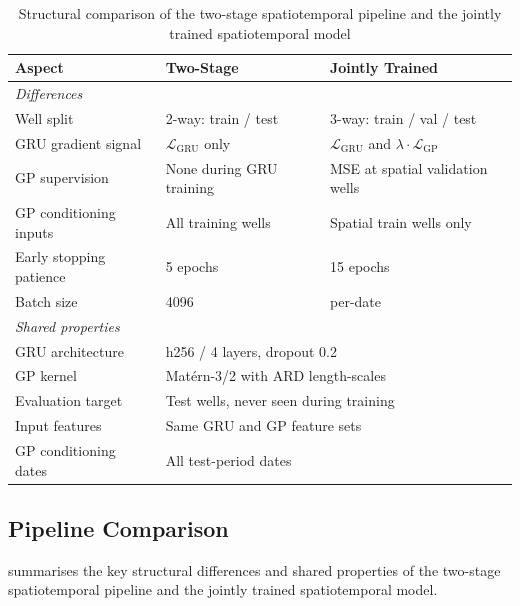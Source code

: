 \begin{table}[htbp]
\centering
\begin{tabular}{@{}lll@{}}
\toprule
\textbf{Aspect} & \textbf{Two-Stage} & \textbf{Jointly Trained} \\
\midrule
\multicolumn{3}{l}{\textit{Differences}} \\[3pt]
Well split & 2-way: train / test & 3-way: train / val / test \\
GRU gradient signal & $\mathcal{L}_{\text{GRU}}$ only & $\mathcal{L}_{\text{GRU}}$ and $\lambda \cdot \mathcal{L}_{\text{GP}}$ \\
GP supervision & None during GRU training & MSE at spatial validation wells \\
GP conditioning inputs & All training wells & Spatial train wells only \\
Early stopping patience & 5 epochs & 15 epochs \\
Batch size & 4096 & per-date \\[3pt]
\midrule
\multicolumn{3}{l}{\textit{Shared properties}} \\[3pt]
GRU architecture & \multicolumn{2}{l}{h256 / 4 layers, dropout 0.2} \\
GP kernel & \multicolumn{2}{l}{Matérn-3/2 with ARD length-scales} \\
Evaluation target & \multicolumn{2}{l}{Test wells, never seen during training} \\
Input features & \multicolumn{2}{l}{Same GRU and GP feature sets} \\
GP conditioning dates & \multicolumn{2}{l}{All test-period dates} \\
\bottomrule
\end{tabular}
\caption{Structural comparison of the two-stage spatiotemporal pipeline and the jointly trained spatiotemporal model}
\label{tab:pipeline_comparison}
\end{table}

\subsection{Pipeline Comparison}
\label{subsec:pipeline_comparison_methods}

 summarises the key structural differences and shared
properties of the two-stage spatiotemporal pipeline and the jointly trained spatiotemporal model.

